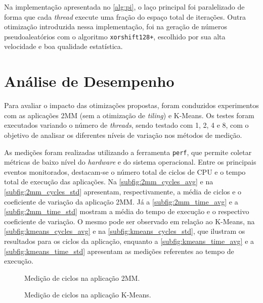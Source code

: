 Na implementação apresentada no \autoref{alg:pi}, o laço principal foi paralelizado de forma que cada \textit{thread} execute uma fração do espaço total de iterações. Outra otimização introduzida nessa implementação, foi na geração de números pseudoaleatórios com o algoritmo \texttt{xorshift128+}, escolhido por sua alta velocidade e boa qualidade estatística.

\section{Análise de Desempenho}\label{sec:desempenho}

Para avaliar o impacto das otimizações propostas, foram conduzidos experimentos com as aplicações 2MM (sem a otimização de \textit{tiling}) e K-Means. Os testes foram executados variando o número de \textit{threads}, sendo testado com 1, 2, 4 e 8, com o objetivo de analisar os diferentes níveis de variação nos métodos de medição.

As medições foram realizadas utilizando a ferramenta \texttt{perf}, que permite coletar métricas de baixo nível do \textit{hardware} e do sistema operacional. Entre os principais eventos monitorados, destacam-se o número total de ciclos de CPU e o tempo total de execução das aplicações. Na \autoref{subfig:2mm_cycles_avg} e na \autoref{subfig:2mm_cycles_std} apresentam, respectivamente, a média de ciclos e o coeficiente de variação da aplicação 2MM. Já a \autoref{subfig:2mm_time_avg} e a \autoref{subfig:2mm_time_std} mostram a média do tempo de execução e o respectivo coeficiente de variação. O mesmo pode ser observado em relação ao K-Means, na \autoref{subfig:kmeans_cycles_avg} e na \autoref{subfig:kmeans_cycles_std}, que ilustram os resultados para os ciclos da aplicação, enquanto a \autoref{subfig:kmeans_time_avg} e a \autoref{subfig:kmeans_time_std} apresentam as medições referentes ao tempo de execução.

\begin{figure}[htbp]
	\caption{Medição de ciclos na aplicação 2MM.}
	\centering
	\hfill
	\fonte{}
	\label{fig:2mm_cycles}
\end{figure}

\begin{figure}[htbp]
	\caption{Medição de ciclos na aplicação K-Means.}
	\centering
	\hfill
	\fonte{}
	\label{fig:kmeans_cycles}
\end{figure}

